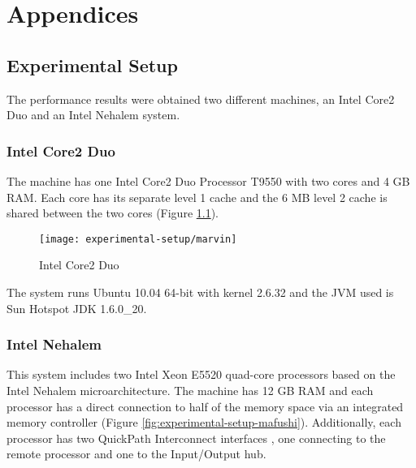 
\part{Appendices}
\label{part:appendices}

\chapter{Experimental Setup}
\label{chap:experimental-setup}

The performance results were obtained two different machines, an Intel
Core2 Duo and an Intel Nehalem system.

\section{Intel Core2 Duo}
\label{sec:experimental-setup-marvin}

The machine has one Intel Core2 Duo Processor T9550 with two cores and
4 GB RAM. Each core has its separate level 1 cache and the 6 MB level
2 cache is shared between the two cores (Figure
\ref{fig:experimental-setup-marvin}).

\begin{figure}[htb]
  \centering
  \texttt{[image: experimental-setup/marvin]}
  \caption[Intel Core2 Duo]{Intel Core2 Duo}
  \label{fig:experimental-setup-marvin}
\end{figure}

The system runs Ubuntu 10.04 64-bit with kernel 2.6.32 and the JVM
used is Sun Hotspot JDK 1.6.0\_20.

\section{Intel Nehalem}
\label{sec:experimental-setup-mafushi}

This system includes two Intel Xeon E5520 quad-core processors based
on the Intel Nehalem microarchitecture. The machine has 12 GB RAM and
each processor has a direct connection to half of the memory space via
an integrated memory controller (Figure
\ref{fig:experimental-setup-mafushi}). Additionally, each processor
has two QuickPath Interconnect interfaces \cite{Maddox2009}, one
connecting to the remote processor and one to the Input/Output hub.

